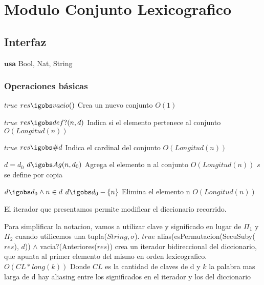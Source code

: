 \section{Modulo Conjunto Lexicografico}

\subsection{Interfaz}

$\textbf{usa}$ Bool, Nat, String

\subsubsection*{Operaciones básicas}

 {$true$}
 {$res \igobs vacio()$}
 {Crea un nuevo conjunto}
 {$O(1)$}
 {}

 
  {$true$}
  {$res \igobs def?(n,d)$}
  {Indica si el elemento pertenece al conjunto}
  {$O(Longitud(n))$}
  {}
  
  {$true$}
  {$res \igobs \# d$}
  {Indica el cardinal del conjunto}
  {$O(Longitud(n))$}
  {}

  {$d=d_0$}
  {$d \igobs Ag(n, d_0)$}
  {Agrega el elemento n al conjunto}
  {$O(Longitud(n))$}
  {$s$ se define por copia}

 {$d \igobs d_0 \land n \in d$}
 {$d \igobs d_0 - \{ n \}$}
 {Elimina el elemento n}
 {$O(Longitud(n))$}
 {}


 

  El iterador que presentamos permite modificar el diccionario recorrido.
  

  Para simplificar la notacion, vamos a utilizar clave y significado en lugar de $\Pi_1$ y $\Pi_2$ cuando utilicemos una tupla($String,\sigma$).
 {$true$}
 {alias(esPermutacion(SecuSuby($res$), $d$)) $\land$ vacia?(Anteriores($res$))}
 {crea un iterador bidireccional del diccionario, que apunta al primer elemento del mismo en orden lexicografico.}
  {$O(CL*long(k))$ Donde $CL$ es la cantidad de claves de d y $k$ la palabra mas larga de d}
  {hay aliasing entre los significados en el iterador y los del diccionario}


